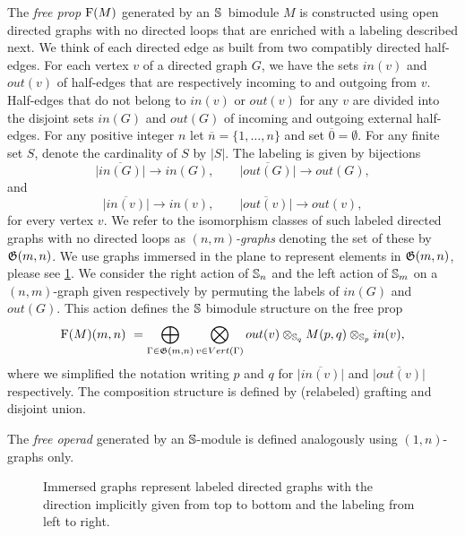 The \textit{free prop} $\F(M)$ generated by an \mbox{$\S$ bimodule} $M$ is constructed using open directed graphs with no directed loops that are enriched with a labeling described next.
We think of each directed edge as built from two compatibly directed half-edges. For each vertex $v$ of a directed graph $G$, we have the sets $in(v)$ and $out(v)$ of half-edges that are respectively incoming to and outgoing from $v$.
Half-edges that do not belong to $in(v)$ or $out(v)$ for any $v$ are divided into the disjoint sets $in(G)$ and $out(G)$ of incoming and outgoing external half-edges. For any positive integer $n$ let $\overline{n} = \{1,\dots,n\}$ and set $\overline{0} = \emptyset$. For any finite set $S$, denote the cardinality of $S$ by $|S|$.
The labeling is given by bijections  
\begin{equation*}
\overline{|in(G)|}\to in(G), \qquad
\overline{|out(G)|}\to out(G),
\end{equation*}
and
\begin{equation*}
\overline{|in(v)|}\to in(v), \qquad
\overline{|out(v)|}\to out(v),
\end{equation*}
for every vertex $v$.
We refer to the isomorphism classes of such labeled directed graphs with no directed loops as $(n,m)$\textit{-graphs} denoting the set of these by $\G(m,n)$.
We use graphs immersed in the plane to represent elements in $\G(m,n)$, please see \cref{f:immersion}.
We consider the right action of $\S_n$ and the left action of $\S_m$ on a $(n,m)$-graph given respectively by permuting the labels of $in(G)$ and $out(G)$.
This action defines the $\S$ bimodule structure on the free prop
\begin{equation} \label{e:free prop}
\F(M)(m,n) \ = \bigoplus_{\Gamma \in \G(m,n)} \bigotimes_{v \in Vert(\Gamma)} out(v) \otimes_{\S_q} M(p, q) \otimes_{\S_p} in(v),
\end{equation}
where we simplified the notation writing $p$ and $q$ for $\overline{|in(v)|}$ and $\overline{|out(v)|}$ respectively.
The composition structure is defined by (relabeled) grafting and disjoint union.

The \textit{free operad} generated by an $\S$-module is defined analogously using $(1,n)$-graphs only.

\begin{figure}
	
	\caption{Immersed graphs represent labeled directed graphs with the direction implicitly given from top to bottom and the labeling from left to right.}
	\label{f:immersion}
\end{figure}

